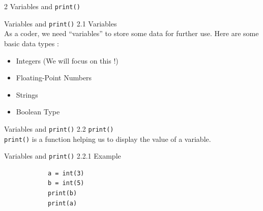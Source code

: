 \documentclass{beamer}
\begin{document}
    \begin{frame}[plain,c]
        \begin{center}
            {\color{blue} \LARGE 2 Variables and \texttt{print()}}
        \end{center}
        
    \end{frame}
    
    \begin{frame}{Variables and \texttt{print()}}
        \color{blue} \Large 2.1 Variables \\
        
        \color{black} \normalsize \vskip 10pt 
        As a coder, we need ``variables'' to store some data for further use. 
        Here are some basic data types :
        \begin{itemize}
            \item Integers (We will focus on this !)
            \item Floating-Point Numbers
            \item Strings
            \item Boolean Type
        \end{itemize}
        
    \end{frame}
    
    \begin{frame}{Variables and \texttt{print()}}
        \color{blue} \Large 2.2 \texttt{print()} \\
        \color{black} \normalsize \vskip 10pt \texttt{print()} is a function helping us to display the value of a variable.
        
    \end{frame}
    
    \begin{frame}[fragile]{Variables and \texttt{print()}}
        \color{blue} \Large 2.2.1 Example \\
        \color{black} \normalsize \vskip 10pt
        \begin{verbatim}
            a = int(3)
            b = int(5)
            print(b)
            print(a)
        \end{verbatim}

    \end{frame}
        
\end{document}
